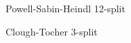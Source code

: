 \begin{foil}{Powell-Sabin-Heindl 12-split}
\begin{center}
\end{center}
\end{foil}

\begin{foil}{Clough-Tocher 3-split}
\begin{center}
\end{center}
\end{foil}

